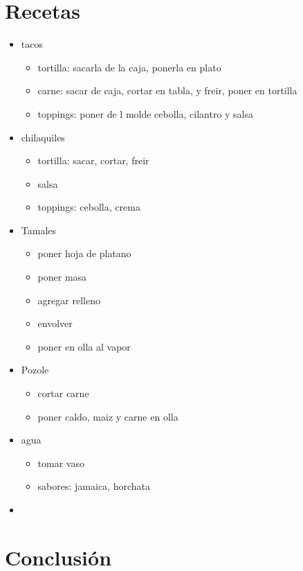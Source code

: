 \documentclass{article}
\begin{document}
\section{Recetas}
\begin{itemize}
    \item tacos
    \begin{itemize}
        \item tortilla: sacarla de la caja, ponerla en plato
        \item carne: sacar de caja, cortar en tabla, y freir, poner en tortilla 
        \item toppings: poner de l molde cebolla, cilantro y salsa
    \end{itemize}
    \item chilaquiles
    \begin{itemize}
        \item tortilla: sacar, cortar, freir
        \item salsa
        \item toppings: cebolla, crema
    \end{itemize}
    \item Tamales
    \begin{itemize}
        \item poner hoja de platano
        \item poner masa
        \item agregar relleno
        \item envolver
        \item poner en olla al vapor 
    \end{itemize}
    \item Pozole
    \begin{itemize}
        \item cortar carne
        \item poner caldo, maiz y carne en olla
    \end{itemize}
    \item agua 
    \begin{itemize}
        \item tomar vaso
        \item sabores: jamaica, horchata
    \end{itemize}
    \item 
\end{itemize}

\section{Conclusión}
\end{document}
